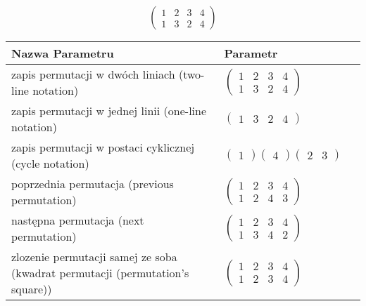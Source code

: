 \documentclass[12pt]{article}
\begin{document}
\subsection{}
\begin{center}
\[
\begin{pmatrix}
	1 & 2 & 3 & 4 \\ 
	1 & 3 & 2 & 4 
\end{pmatrix}
\]

\begin{tabular}{|m{0.6\linewidth}|m{0.4\linewidth}|}
	\hline
	Nazwa Parametru & Parametr \\
	\hline
	zapis permutacji w dwóch liniach (two-line notation) & $\begin{pmatrix} 1 & 2 & 3 & 4 \\ 
1 & 3 & 2 & 4 \end{pmatrix}$ \\ 
	\hline
	zapis permutacji w jednej linii (one-line notation) & $\begin{pmatrix} 1 & 3 & 2 & 4 \end{pmatrix}$ \\ 
	\hline
	zapis permutacji w postaci cyklicznej (cycle notation) & $\begin{pmatrix} 1 \end{pmatrix} \begin{pmatrix} 4 \end{pmatrix} \begin{pmatrix} 2 & 3 \end{pmatrix} $ \\ 
	\hline
	poprzednia permutacja (previous permutation) & $\begin{pmatrix} 1 & 2 & 3 & 4 \\ 
1 & 2 & 4 & 3 \end{pmatrix}$ \\ 
	\hline
	następna permutacja (next permutation) & $\begin{pmatrix} 1 & 2 & 3 & 4 \\ 
1 & 3 & 4 & 2 \end{pmatrix}$ \\ 
	\hline
	zlozenie permutacji samej ze soba (kwadrat permutacji (permutation's square)) & $\begin{pmatrix} 1 & 2 & 3 & 4 \\ 
1 & 2 & 3 & 4 \end{pmatrix}$ \\ 
	\hline
\end{tabular}
\end{center}
\end{document}
